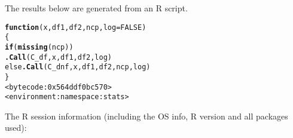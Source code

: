 \documentclass{article}\usepackage[]{graphicx}\usepackage[]{color}
\makeatletter
\newcommand{\hlkwd}[1]{\textcolor[rgb]{0.737,0.353,0.396}{\textbf{#1}}}%
\newenvironment{kframe}{%
 \def\at@end@of@kframe{}%
 \ifinner\ifhmode%
  \def\at@end@of@kframe{\end{minipage}}%
  \begin{minipage}{\columnwidth}%
 \fi\fi%
 \def\FrameCommand##1{\hskip\@totalleftmargin \hskip-\fboxsep
 \colorbox{shadecolor}{##1}\hskip-\fboxsep
     \hskip-\linewidth \hskip-\@totalleftmargin \hskip\columnwidth}%
 \MakeFramed {\advance\hsize-\width
   \@totalleftmargin\z@ \linewidth\hsize
   \@setminipage}}%
 {\par\unskip\endMakeFramed%
 \at@end@of@kframe}
\newenvironment{knitrout}{}{} %
\makeatother
\begin{document}
\title{}



\maketitle
The results below are generated from an R script.

\begin{knitrout}
\color{fgcolor}\begin{kframe}
\begin{alltt}
\hlkwd{function} (x, df1, df2, ncp, log = FALSE) 
\{
    \hlkwd{if} (\hlkwd{missing}(ncp)) 
        \hlkwd{.Call}(C_df, x, df1, df2, log)
    else \hlkwd{.Call}(C_dnf, x, df1, df2, ncp, log)
\}
<bytecode: 0x564ddf0bc570>
<environment: namespace:stats>
\end{alltt}


{\ttfamily\noindent\bfseries{}}\end{kframe}
\end{knitrout}

The R session information (including the OS info, R version and all
packages used):
\end{document}
